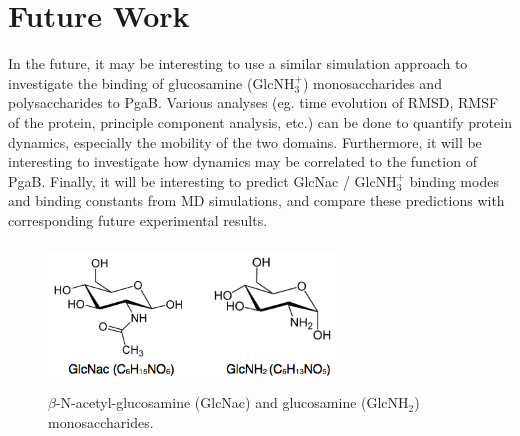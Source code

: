 \section{Future Work}
In the future, it may be interesting to use a similar simulation approach to investigate the binding of glucosamine (GlcNH$_3^+$) monosaccharides and polysaccharides to PgaB.  Various analyses (eg. time evolution of RMSD, RMSF of the protein, principle component analysis, etc.) can be done to quantify protein dynamics, especially the mobility of the two domains. Furthermore, it will be interesting to investigate how dynamics may be correlated to the function of PgaB.  Finally, it will be interesting to predict GlcNac / GlcNH$_3^+$ binding modes and binding constants from MD simulations, and compare these predictions with corresponding future experimental results.





\begin{figure}[nag]
\centering
\includegraphics[height=1.5in, width=3in]{figures/results4/figure_pgab_sugars.png}
\caption[NAG]{$\beta$-N-acetyl-glucosamine (GlcNac) and glucosamine (GlcNH$_2$) monosaccharides.}
\label{fig:nag}
\end{figure}

